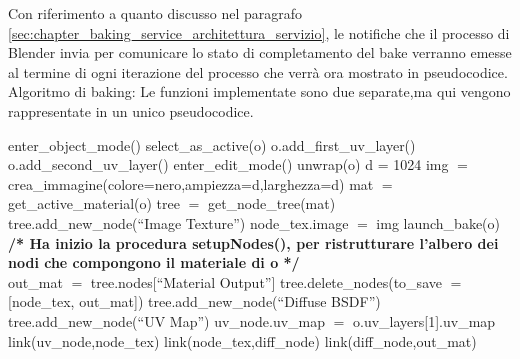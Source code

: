 Con riferimento a quanto discusso nel paragrafo \ref{sec:chapter_baking_service_architettura_servizio}, le notifiche che il processo di Blender invia per comunicare lo stato di completamento del bake verranno emesse al termine di ogni iterazione del processo che verrà ora mostrato in pseudocodice.
\newpage
Algoritmo di baking: Le funzioni implementate sono due separate,ma qui vengono rappresentate in un unico pseudocodice.
\\
\begin{algorithm}[H]
	 {
  		 {
  			 {
      			enter\_object\_mode()\;
	  			select\_as\_active(o)\; 
	 			o.add\_first\_uv\_layer()\; 
	  			o.add\_second\_uv\_layer()\; 
				enter\_edit\_mode()\; 
				unwrap(o)\;
     		}
     		d = 1024\;
			img $=$ crea\_immagine(colore=nero,ampiezza=d,larghezza=d)\;
			mat $=$ get\_active\_material(o)\;
			tree $=$ get\_node\_tree(mat)\;
			tree.add\_new\_node(“Image Texture”)\;
			node\_tex.image $=$ img\;
			launch\_bake(o)\;
			\textbf{/* Ha inizio la procedura setupNodes(), 
			per ristrutturare l'albero dei nodi che compongono 
			il materiale di o */}
			\\
			out\_mat $=$ tree.nodes[“Material Output”]\;
			tree.delete\_nodes(to\_save $=$ [node\_tex, out\_mat])\;
			tree.add\_new\_node(“Diffuse BSDF”)\;
			tree.add\_new\_node(“UV Map”)\;
			uv\_node.uv\_map $=$ o.uv\_layers[1].uv\_map\;
			link(uv\_node,node\_tex)\;
			link(node\_tex,diff\_node)\;
			link(diff\_node,out\_mat)\;
		}
	}
\end{algorithm}

